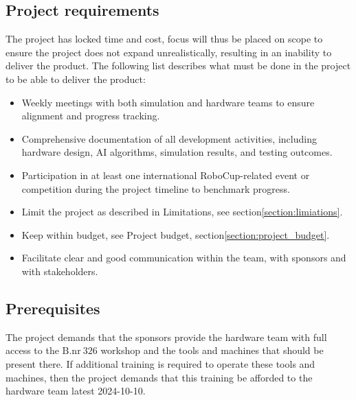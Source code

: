 
\subsection{Project requirements}

The project has locked time and cost, focus will thus be placed on scope to ensure the project does not expand unrealistically, resulting in an inability to deliver the product. The following list describes what must be done in the project to be able to deliver the product:
\begin{itemize}
    \item Weekly meetings with both simulation and hardware teams to ensure alignment and progress tracking.
    \item Comprehensive documentation of all development activities, including hardware design, AI algorithms, simulation results, and testing outcomes.
    \item Participation in at least one international RoboCup-related event or competition during the project timeline to benchmark progress.
    \item Limit the project as described in Limitations, see section\:\ref{section:limiations}.
    \item Keep within budget, see Project budget, section\:\ref{section:project_budget}.
    \item Facilitate clear and good communication within the team, with sponsors and with stakeholders.
\end{itemize}



\subsection{Prerequisites}

The project demands that the sponsors provide the hardware team with full access to the $\text{B.nr}\:326$ workshop and the tools and machines that should be present there. If additional training is required to operate these tools and machines, then the project demands that this training be afforded to the hardware team latest 2024-10-10.



